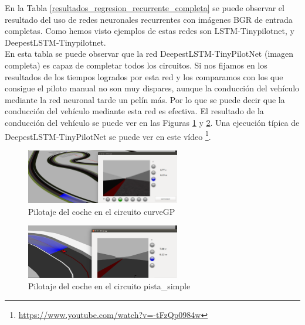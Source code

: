 En la Tabla \ref{resultados_regresion_recurrente_completa} se puede observar el resultado del uso de redes neuronales recurrentes con imágenes BGR de entrada completas. Como hemos visto ejemplos de estas redes son LSTM-Tinypilotnet, y DeepestLSTM-Tinypilotnet.\\

En esta tabla se puede observar que la red DeepestLSTM-TinyPilotNet (imagen completa) es capaz de completar todos los circuitos. Si nos fijamos en los resultados de los tiempos logrados por esta red y los comparamos con los que consigue el piloto manual no son muy dispares, aunque la conducción del vehículo mediante la red neuronal tarde un pelín más. Por lo que se puede decir que la conducción del vehículo mediante esta red es efectiva. El resultado de la conducción del vehículo se puede ver en las Figuras \ref{fig.curve_reg} y \ref{fig.small_reg}. Una ejecución típica de DeepestLSTM-TinyPilotNet se puede ver en este vídeo  \footnote{\url{https://www.youtube.com/watch?v=-tFzQp0984w}}.\\

\begin{figure}
\begin{center}
	\includegraphics[width=0.6\textwidth]{figures/Regresion/deep_curve.png}
   \caption{Pilotaje del coche en el circuito curveGP}
	\label{fig.curve_reg}
\end{center}
\end{figure}

\begin{figure}
\begin{center}
	\includegraphics[width=0.6\textwidth]{figures/Regresion/deep_small.png}
   \caption{Pilotaje del coche en el circuito pista\_simple}
	\label{fig.small_reg}
\end{center}
\end{figure}



